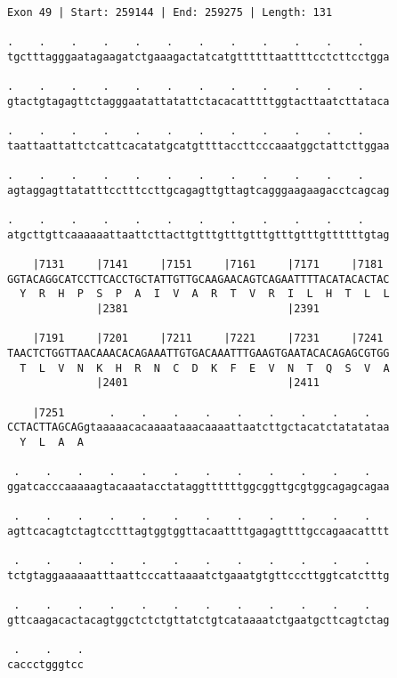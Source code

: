 \documentclass{article}
\begin{document}
\begin{Verbatim}
Exon 49 | Start: 259144 | End: 259275 | Length: 131
 
.    .    .    .    .    .    .    .    .    .    .    .    
tgctttagggaatagaagatctgaaagactatcatgttttttaattttcctcttcctgga
  
.    .    .    .    .    .    .    .    .    .    .    .    
gtactgtagagttctagggaatattatattctacacatttttggtacttaatcttataca
  
.    .    .    .    .    .    .    .    .    .    .    .    
taattaattattctcattcacatatgcatgttttaccttcccaaatggctattcttggaa
  
.    .    .    .    .    .    .    .    .    .    .    .    
agtaggagttatatttcctttccttgcagagttgttagtcagggaagaagacctcagcag
  
.    .    .    .    .    .    .    .    .    .    .    .    
atgcttgttcaaaaaattaattcttacttgtttgtttgtttgtttgtttgttttttgtag
  
    |7131     |7141     |7151     |7161     |7171     |7181 
GGTACAGGCATCCTTCACCTGCTATTGTTGCAAGAACAGTCAGAATTTTACATACACTAC
  Y  R  H  P  S  P  A  I  V  A  R  T  V  R  I  L  H  T  L  L
              |2381                         |2391           
  
    |7191     |7201     |7211     |7221     |7231     |7241 
TAACTCTGGTTAACAAACACAGAAATTGTGACAAATTTGAAGTGAATACACAGAGCGTGG
  T  L  V  N  K  H  R  N  C  D  K  F  E  V  N  T  Q  S  V  A
              |2401                         |2411           
  
    |7251       .    .    .    .    .    .    .    .    .   
CCTACTTAGCAGgtaaaaacacaaaataaacaaaattaatcttgctacatctatatataa
  Y  L  A  A                                                
  
 .    .    .    .    .    .    .    .    .    .    .    .   
ggatcacccaaaaagtacaaatacctataggttttttggcggttgcgtggcagagcagaa
  
 .    .    .    .    .    .    .    .    .    .    .    .   
agttcacagtctagtcctttagtggtggttacaattttgagagttttgccagaacatttt
  
 .    .    .    .    .    .    .    .    .    .    .    .   
tctgtaggaaaaaatttaattcccattaaaatctgaaatgtgttcccttggtcatctttg
  
 .    .    .    .    .    .    .    .    .    .    .    .   
gttcaagacactacagtggctctctgttatctgtcataaaatctgaatgcttcagtctag
  
 .    .    .
caccctgggtcc
\end{Verbatim}
\newpage
\end{document}
